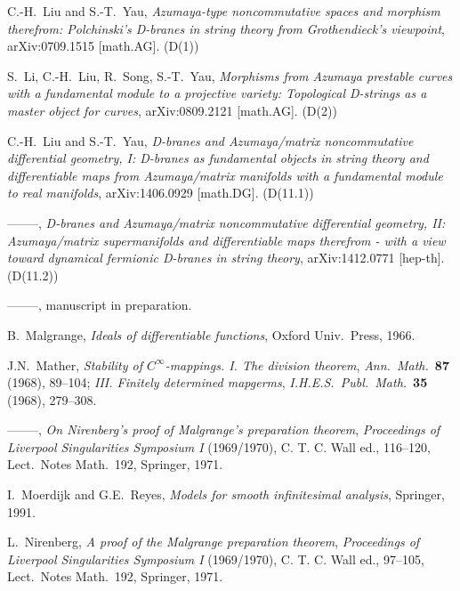 \documentclass[11pt]{article}
\numberwithin{equation}{subsection}
\begin{document}
{\begin{thebibliography}{AAaaaa}
\bibitem[L-Y1]{} C.-H.~Liu and S.-T.~Yau,
  {\it Azumaya-type noncommutative spaces and morphism therefrom:
       Polchinski's D-branes in string theory from Grothendieck's
       viewpoint},
  arXiv:0709.1515 [math.AG]. (D(1))

\bibitem[L-L-S-Y]{} S.~Li, C.-H.~Liu, R.~Song, S.-T.~Yau,
 {\it Morphisms from Azumaya prestable curves with a fundamental module
       to a projective variety:
      Topological D-strings as a master object for curves},
  arXiv:0809.2121 [math.AG]. (D(2))

\bibitem[L-Y2]{} C.-H.~Liu and S.-T.~Yau,
  {\it D-branes and Azumaya/matrix noncommutative differential geometry,
 I: D-branes as fundamental objects in string theory  and differentiable maps
    from Azumaya/matrix manifolds with a fundamental module to real manifolds},
  arXiv:1406.0929 [math.DG]. (D(11.1))

\bibitem[L-Y3]{} --------,
 {\it D-branes and Azumaya/matrix noncommutative differential geometry,
 II: Azumaya/matrix supermanifolds and differentiable maps therefrom
      - with a view toward dynamical fermionic D-branes in string theory},
  arXiv:1412.0771 [hep-th]. (D(11.2))

\bibitem[L-Y4]{} --------,
 manuscript in preparation.

\bibitem[Mal]{} B.~Malgrange,
%
%
 {\sl Ideals of differentiable functions},
  Oxford Univ.\ Press, 1966.

\bibitem[Mat1]{} J.N.~Mather,
 {\it Stability of $C^{\infty}$-mappings. I. The division theorem},
    {\sl Ann.\ Math.}\  {\bf 87} (1968), 89--104;
 {\it III. Finitely determined mapgerms},
    {\sl   I.H.E.S.\ Publ.\ Math.}\  {\bf 35} (1968), 279--308.

\bibitem[Mat2]{} --------,
 {\it On Nirenberg's proof of Malgrange's preparation theorem},
  {\sl Proceedings of Liverpool Singularities Symposium I} (1969/1970),
   C. T. C. Wall ed., 116--120,
   Lect.\ Notes Math.\ 192, Springer, 1971.

\bibitem[M-R]{} I.\ Moerdijk and G.E.\ Reyes,
 {\sl Models for smooth infinitesimal analysis},
  Springer, 1991.

\bibitem[Ni]{} L.~Nirenberg,
 {\it A proof of the Malgrange preparation theorem},
 {\sl Proceedings of Liverpool Singularities Symposium I} (1969/1970),
   C. T. C. Wall ed., 97--105,
   Lect.\ Notes Math.\ 192, Springer, 1971.


\end{thebibliography}}
\end{document}

